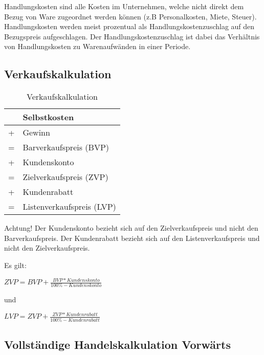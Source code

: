 Handlungskosten sind alle Kosten im Unternehmen, welche nicht direkt dem Bezug von Ware zugeordnet werden können (z.B Personalkosten, Miete, Steuer). Handlungskosten werden meist prozentual als Handlungskostenzuschlag auf den Bezugspreis aufgeschlagen. Der Handlungskostenzuschlag ist dabei das Verhältnis von Handlungskosten zu Warenaufwänden in einer Periode.

\subsection{Verkaufskalkulation}

\begin{table}
    [H]
    \centering
    \begin{tabular}{c|l}
          & Selbstkosten              \\
        \hline
        + & Gewinn                    \\
        \hline
        = & Barverkaufspreis (BVP)    \\
        \hline
        + & Kundenskonto              \\
        \hline
        = & Zielverkaufspreis (ZVP)   \\
        \hline
        + & Kundenrabatt              \\
        \hline
        = & Listenverkaufspreis (LVP) \\
    \end{tabular}
    \caption{Verkaufskalkulation}
\end{table}

Achtung! Der Kundenskonto bezieht sich auf den Zielverkaufspreis und nicht den Barverkaufspreis. Der Kundenrabatt bezieht sich auf den Listenverkaufspreis und nicht den Zielverkaufspreis.

Es gilt:

\begin{center}
    $ZVP = BVP + \frac{BVP * Kundenskonto}{100\% - Kundenskonto}$
\end{center}

und

\begin{center}
    $LVP = ZVP + \frac{ZVP * Kundenrabatt}{100\% - Kundenrabatt}$
\end{center}

\subsection{Vollständige Handelskalkulation Vorwärts}

